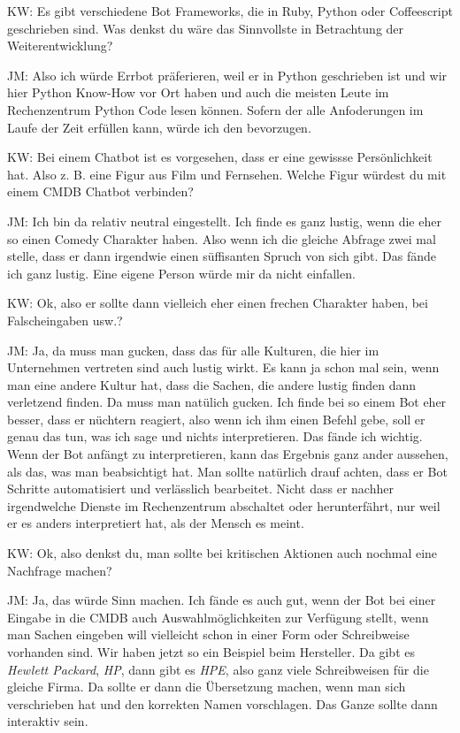\begin{list}{X:}{\setlength{\labelsep}{5mm}}
\item[KW:] Es gibt verschiedene Bot Frameworks, die in Ruby, Python oder Coffeescript geschrieben sind. Was denkst du wäre das Sinnvollste in Betrachtung der Weiterentwicklung?
\item[JM:] Also ich würde Errbot präferieren, weil er in Python geschrieben ist und wir hier Python Know-How vor Ort haben und auch die meisten Leute im Rechenzentrum Python Code lesen können. Sofern der alle Anfoderungen im Laufe der Zeit erfüllen kann, würde ich den bevorzugen.
\item[KW:] Bei einem Chatbot ist es vorgesehen, dass er eine gewissse Persönlichkeit hat. Also z. B. eine  Figur aus Film und Fernsehen. Welche Figur würdest du mit einem CMDB Chatbot verbinden?
\item[JM:] Ich bin da relativ neutral eingestellt. Ich finde es ganz lustig, wenn die eher so einen Comedy Charakter haben. Also wenn ich die gleiche Abfrage zwei mal stelle, dass er dann irgendwie einen süffisanten Spruch von sich gibt. Das fände ich ganz lustig. Eine eigene Person würde mir da nicht einfallen.
\item[KW:] Ok, also er sollte dann vielleich eher einen frechen Charakter haben, bei Falscheingaben usw.?
\item[JM:] Ja, da muss man gucken, dass das für alle Kulturen, die hier im Unternehmen vertreten sind auch lustig wirkt. Es kann ja schon mal sein, wenn man eine andere Kultur hat, dass die Sachen, die andere lustig finden dann verletzend finden. Da muss man natülich gucken. Ich finde bei so einem Bot eher besser, dass er nüchtern reagiert, also wenn ich ihm einen Befehl gebe, soll er genau das tun, was ich sage und nichts interpretieren. Das fände ich wichtig. Wenn der Bot anfängt zu interpretieren, kann das Ergebnis ganz ander aussehen, als das, was man beabsichtigt hat. Man sollte natürlich drauf achten, dass er Bot Schritte automatisiert und verlässlich bearbeitet. Nicht dass er nachher irgendwelche Dienste im Rechenzentrum abschaltet oder herunterfährt, nur weil er es anders interpretiert hat, als der Mensch es meint.
\item[KW:] Ok, also denkst du, man sollte bei kritischen Aktionen auch nochmal eine Nachfrage machen?
\item[JM:] Ja, das würde Sinn machen. Ich fände es auch gut, wenn der Bot bei einer Eingabe in die CMDB auch Auswahlmöglichkeiten zur Verfügung stellt, wenn man Sachen eingeben will vielleicht schon in einer Form oder Schreibweise vorhanden sind. Wir haben jetzt so ein Beispiel beim Hersteller. Da gibt es \textit{Hewlett Packard}, \textit{HP}, dann gibt es \textit{HPE}, also ganz viele Schreibweisen für die gleiche Firma. Da sollte er dann die Übersetzung machen, wenn man sich verschrieben hat und den korrekten Namen vorschlagen. Das Ganze sollte dann interaktiv sein.

\end{list}
